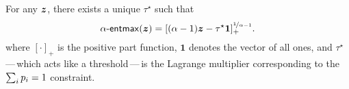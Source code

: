 \begin{lemma}
    \label{lemma:tsallis_reduction}%
    For any $\bm{z}$, there exists a unique $\tau^\star$ such that
    \begin{equation}\label{eq:entmax_form}
        \mathop{\mathsf{\alpha}\textnormal{-}\mathsf{entmax}}(\bm{z})
        = [(\alpha - 1){\bm{z}} - \tau^\star \bm{1}]_+^{\nicefrac{1}{\alpha-1}}.
    \end{equation}
    where $[\cdot]_+$ is the positive part function, $\bm{1}$
    denotes the vector of all ones, and $\tau^\star$\,---\,which acts like a
    threshold\,---\,is the Lagrange multiplier corresponding to the $\sum_i
        p_i=1$ constraint.
\end{lemma}

